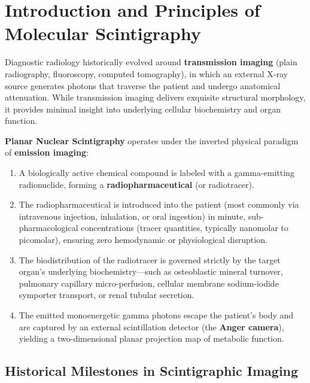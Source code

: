 \documentclass[11pt,a4paper]{article}
\begin{document}
\section{Introduction and Principles of Molecular Scintigraphy}

Diagnostic radiology historically evolved around \textbf{transmission imaging} (plain radiography, fluoroscopy, computed tomography), in which an external X-ray source generates photons that traverse the patient and undergo anatomical attenuation. While transmission imaging delivers exquisite structural morphology, it provides minimal insight into underlying cellular biochemistry and organ function.

\textbf{Planar Nuclear Scintigraphy} operates under the inverted physical paradigm of \textbf{emission imaging}:
\begin{enumerate}[leftmargin=*]
    \item A biologically active chemical compound is labeled with a gamma-emitting radionuclide, forming a \textbf{radiopharmaceutical} (or radiotracer).
    \item The radiopharmaceutical is introduced into the patient (most commonly via intravenous injection, inhalation, or oral ingestion) in minute, sub-pharmacological concentrations (tracer quantities, typically nanomolar to picomolar), ensuring zero hemodynamic or physiological disruption.
    \item The biodistribution of the radiotracer is governed strictly by the target organ's underlying biochemistry—such as osteoblastic mineral turnover, pulmonary capillary micro-perfusion, cellular membrane sodium-iodide symporter transport, or renal tubular secretion.
    \item The emitted monoenergetic gamma photons escape the patient's body and are captured by an external scintillation detector (the \textbf{Anger camera}), yielding a two-dimensional planar projection map of metabolic function.
\end{enumerate}

\subsection{Historical Milestones in Scintigraphic Imaging}
\end{document}
